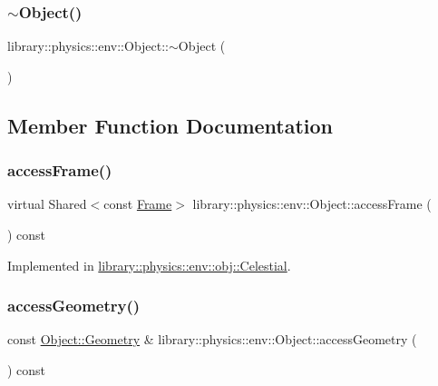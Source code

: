 \subsubsection{\texorpdfstring{$\sim$\+Object()}{~Object()}}
{\footnotesize\ttfamily library\+::physics\+::env\+::\+Object\+::$\sim$\+Object (\begin{DoxyParamCaption}{ }\end{DoxyParamCaption})\hspace{0.3cm}{\ttfamily [pure virtual]}}



\subsection{Member Function Documentation}
\mbox{\label{classlibrary_1_1physics_1_1env_1_1_object_a6ff59bc7375388118c60b5823dad748b}} 
\subsubsection{\texorpdfstring{access\+Frame()}{accessFrame()}}
{\footnotesize\ttfamily virtual Shared$<$const \hyperlink{classlibrary_1_1physics_1_1coord_1_1_frame}{Frame}$>$ library\+::physics\+::env\+::\+Object\+::access\+Frame (\begin{DoxyParamCaption}{ }\end{DoxyParamCaption}) const\hspace{0.3cm}{\ttfamily [pure virtual]}}



Implemented in \hyperlink{classlibrary_1_1physics_1_1env_1_1obj_1_1_celestial_a6649bfe0bf0795aa4def046a8c38aef5}{library\+::physics\+::env\+::obj\+::\+Celestial}.

\mbox{\label{classlibrary_1_1physics_1_1env_1_1_object_ac7a98e912dadb573e557eb91c8f5e891}} 
\subsubsection{\texorpdfstring{access\+Geometry()}{accessGeometry()}}
{\footnotesize\ttfamily const \hyperlink{classlibrary_1_1physics_1_1env_1_1_object_abdf50733c7ad97327fb64edca5670f13}{Object\+::\+Geometry} \& library\+::physics\+::env\+::\+Object\+::access\+Geometry (\begin{DoxyParamCaption}{ }\end{DoxyParamCaption}) const}

